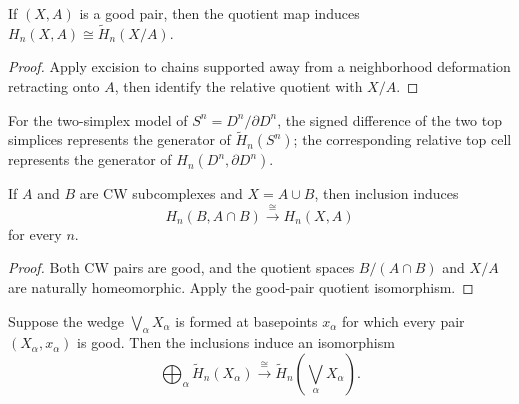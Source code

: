 \begin{proposition}
\label{prop:good-pairs-absolute-homology}
If $(X,A)$ is a good pair, then the quotient map induces $H_n(X,A)\cong\widetilde H_n(X/A)$.
\end{proposition}
\begin{proof}
\sketch Apply excision to chains supported away from a neighborhood deformation retracting onto $A$, then identify the relative quotient with $X/A$.
\end{proof}

\begin{example}
\label{ex:cycles-spheres-disks}
For the two-simplex model of $S^n=D^n/\partial D^n$, the signed difference of the two top simplices represents the generator of $\widetilde H_n(S^n)$; the corresponding relative top cell represents the generator of $H_n(D^n,\partial D^n)$.
\end{example}

\begin{corollary}
\label{cor:excision-cw-subcomplexes}
If $A$ and $B$ are CW subcomplexes and $X=A\cup B$, then inclusion induces
\[
H_n(B,A\cap B)\xrightarrow{\cong}H_n(X,A)
\]
for every $n$.
\end{corollary}

\begin{proof}
\sketch Both CW pairs are good, and the quotient spaces
$B/(A\cap B)$ and $X/A$ are naturally homeomorphic. Apply the good-pair
quotient isomorphism.
\end{proof}

\begin{corollary}
\label{cor:wedge-sum-direct-sum-homology}
Suppose the wedge $\bigvee_\alpha X_\alpha$ is formed at basepoints
$x_\alpha$ for which every pair $(X_\alpha,x_\alpha)$ is good. Then the
inclusions induce an isomorphism
\[
\bigoplus_\alpha\widetilde H_n(X_\alpha)
\xrightarrow{\cong}
\widetilde H_n\left(\bigvee_\alpha X_\alpha\right).
\]
\end{corollary}

